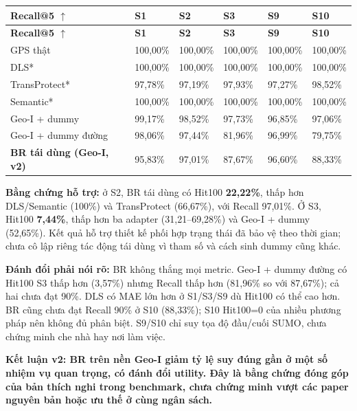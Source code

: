 \documentclass[10pt,a4paper]{article}
\newcommand{\key}[1]{\par\smallskip\noindent\colorbox{pale}{\parbox{\dimexpr\linewidth-2\fboxsep}{\textbf{#1}}}\par\smallskip}
\begin{document}
\begingroup\small
\begin{longtable}{@{}P{3.364cm}P{2.486cm}P{2.486cm}P{2.486cm}P{2.486cm}P{2.486cm}@{}}
\toprule
\textbf{Recall@5 $\uparrow$} & \textbf{S1} & \textbf{S2} & \textbf{S3} & \textbf{S9} & \textbf{S10}\\\midrule
\endfirsthead
\toprule
\textbf{Recall@5 $\uparrow$} & \textbf{S1} & \textbf{S2} & \textbf{S3} & \textbf{S9} & \textbf{S10}\\\midrule
\endhead
\bottomrule\endfoot
GPS thật & 100,00\% & 100,00\% & 100,00\% & 100,00\% & 100,00\%\\
\addlinespace[3pt]
DLS* & 100,00\% & 100,00\% & 100,00\% & 100,00\% & 100,00\%\\
\addlinespace[3pt]
TransProtect* & 97,78\% & 97,19\% & 97,93\% & 97,27\% & 98,52\%\\
\addlinespace[3pt]
Semantic* & 100,00\% & 100,00\% & 100,00\% & 100,00\% & 100,00\%\\
\addlinespace[3pt]
Geo-I + dummy & 99,17\% & 98,52\% & 97,73\% & 96,85\% & 97,06\%\\
\addlinespace[3pt]
Geo-I + dummy đường & 98,06\% & 97,44\% & 81,96\% & 96,99\% & 79,75\%\\
\addlinespace[3pt]
\textbf{BR tái dùng (Geo-I, v2)} & 95,83\% & 97,01\% & 87,67\% & 96,60\% & 88,33\%\\
\end{longtable}
\endgroup
\textbf{Bằng chứng hỗ trợ:} ở S2, BR tái dùng có Hit100 \textbf{22,22\%}, thấp hơn DLS/Semantic (100\%) và TransProtect (66,67\%), với Recall 97,01\%. Ở S3, Hit100 \textbf{7,44\%}, thấp hơn ba adapter (31,21–69,28\%) và Geo-I + dummy (52,65\%). Kết quả hỗ trợ thiết kế phối hợp trạng thái đã bảo vệ theo thời gian; chưa cô lập riêng tác động tái dùng vì tham số và cách sinh dummy cũng khác.

\textbf{Đánh đổi phải nói rõ:} BR không thắng mọi metric. Geo-I + dummy đường có Hit100 S3 thấp hơn (3,57\%) nhưng Recall thấp hơn (81,96\% so với 87,67\%); cả hai chưa đạt 90\%. DLS có MAE lớn hơn ở S1/S3/S9 dù Hit100 có thể cao hơn. BR cũng chưa đạt Recall 90\% ở S10 (88,33\%); S10 Hit100=0 của nhiều phương pháp nên không đủ phân biệt. S9/S10 chỉ suy tọa độ đầu/cuối SUMO, chưa chứng minh che nhà hay nơi làm việc.

\key{Kết luận v2: BR trên nền Geo-I giảm tỷ lệ suy đúng gần ở một số nhiệm vụ quan trọng, có đánh đổi utility. Đây là bằng chứng đóng góp của bản thích nghi trong benchmark, chưa chứng minh vượt các paper nguyên bản hoặc ưu thế ở cùng ngân sách.}
\end{document}

